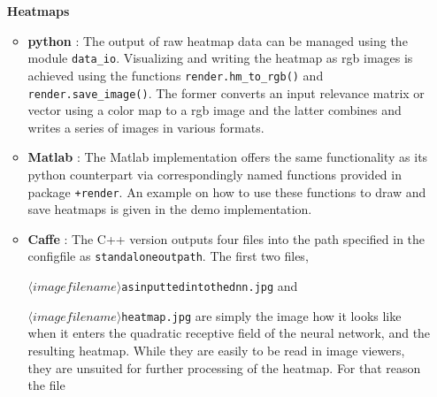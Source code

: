 \documentclass[a4wide]{article}
\begin{document}
\begin{itemize}
\item[{\textbf{Heatmaps}}]
	\begin{itemize}
		\item \textbf{python} : The output of raw heatmap data can be managed using the module \texttt{data\_io}. Visualizing and writing the heatmap as rgb images is achieved using the functions \texttt{render.hm\_to\_rgb()} and \texttt{render.save\_image()}. The former converts an input relevance matrix or vector using a color map to a rgb image and the latter combines and writes a series of images in various formats.
		\item \textbf{Matlab} : The Matlab implementation offers the same functionality as its python counterpart via correspondingly named functions provided in package \texttt{+render}. An example on how to use these functions to draw and save heatmaps is given in the demo implementation.
		\item \textbf{Caffe} : The C++ version outputs four files into the path specified in the configfile as \texttt{standalone\textunderscore outpath}. The first two files, 

\texttt{$\langle imagefilename\rangle$\textunderscore as\textunderscore inputted\textunderscore into\textunderscore the\textunderscore dnn.jpg} and 

\texttt{$\langle imagefilename\rangle$\textunderscore heatmap.jpg} are simply the image how it looks like when it enters the quadratic receptive field of the neural network, and the resulting heatmap. While they are easily to be read in image viewers, they are unsuited for further processing of the heatmap. For that reason the file 


\end{itemize}
\end{itemize}
\end{document}

